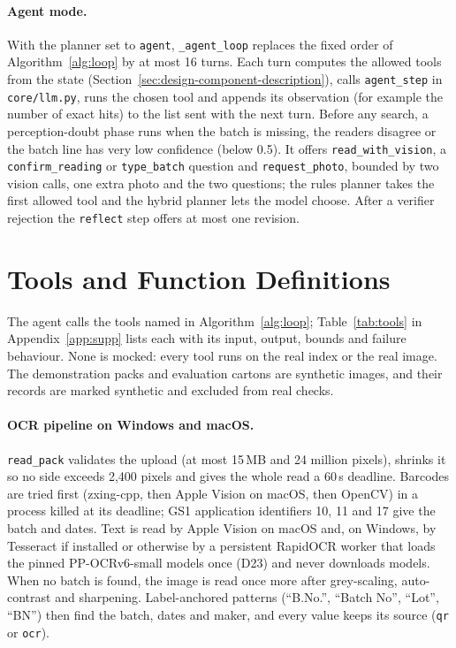 \paragraph{Agent mode.} With the planner set to \texttt{agent}, \texttt{\_agent\_loop} replaces the fixed order of Algorithm~\ref{alg:loop} by at most 16 turns. Each turn computes the allowed tools from the state (Section~\ref{sec:design-component-description}), calls \texttt{agent\_step} in \texttt{core/llm.py}, runs the chosen tool and appends its observation (for example the number of exact hits) to the list sent with the next turn. Before any search, a perception-doubt phase runs when the batch is missing, the readers disagree or the batch line has very low confidence (below 0.5). It offers \texttt{read\_with\_vision}, a \texttt{confirm\_reading} or \texttt{type\_batch} question and \texttt{request\_photo}, bounded by two vision calls, one extra photo and the two questions; the rules planner takes the first allowed tool and the hybrid planner lets the model choose. After a verifier rejection the \texttt{reflect} step offers at most one revision.

\section{Tools and Function Definitions}
\label{sec:impl-tools-and-function-definitions}

The agent calls the tools named in Algorithm~\ref{alg:loop}; Table~\ref{tab:tools} in Appendix~\ref{app:supp} lists each with its input, output, bounds and failure behaviour. None is mocked: every tool runs on the real index or the real image. The demonstration packs and evaluation cartons are synthetic images, and their records are marked synthetic and excluded from real checks.

\paragraph{OCR pipeline on Windows and macOS.} \texttt{read\_pack} validates the upload (at most 15\,MB and 24 million pixels), shrinks it so no side exceeds 2{,}400 pixels and gives the whole read a 60\,s deadline. Barcodes are tried first (zxing-cpp, then Apple Vision on macOS, then OpenCV) in a process killed at its deadline; GS1 application identifiers 10, 11 and 17 give the batch and dates. Text is read by Apple Vision on macOS and, on Windows, by Tesseract if installed or otherwise by a persistent RapidOCR worker that loads the pinned PP-OCRv6-small models once (D23) and never downloads models. When no batch is found, the image is read once more after grey-scaling, auto-contrast and sharpening. Label-anchored patterns (``B.No.'', ``Batch No'', ``Lot'', ``BN'') then find the batch, dates and maker, and every value keeps its source (\texttt{qr} or \texttt{ocr}).

